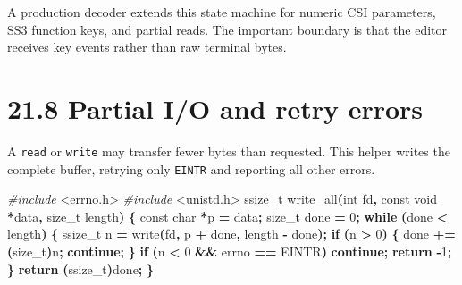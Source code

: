 \documentclass[
  oneside,
  openany]{book}
\newenvironment{Shaded}{\begin{snugshade}}{\end{snugshade}}
\newcommand{\ControlFlowTok}[1]{\textcolor[rgb]{0.13,0.29,0.53}{\textbf{#1}}}
\newcommand{\DataTypeTok}[1]{\textcolor[rgb]{0.13,0.29,0.53}{#1}}
\newcommand{\DecValTok}[1]{\textcolor[rgb]{0.00,0.00,0.81}{#1}}
\newcommand{\ImportTok}[1]{#1}
\newcommand{\NormalTok}[1]{#1}
\newcommand{\OperatorTok}[1]{\textcolor[rgb]{0.81,0.36,0.00}{\textbf{#1}}}
\newcommand{\PreprocessorTok}[1]{\textcolor[rgb]{0.56,0.35,0.01}{\textit{#1}}}
\begin{document}
A production decoder extends this state machine for numeric CSI
parameters, SS3 function keys, and partial reads. The important boundary
is that the editor receives key events rather than raw terminal bytes.

\hypertarget{partial-io-and-retry-errors}{%
\section{21.8 Partial I/O and retry
errors}\label{partial-io-and-retry-errors}}

A \texttt{read} or \texttt{write} may transfer fewer bytes than
requested. This helper writes the complete buffer, retrying only
\texttt{EINTR} and reporting all other errors.

\begin{Shaded}
\begin{Highlighting}[]
\PreprocessorTok{\#include }\ImportTok{\textless{}errno.h\textgreater{}}
\PreprocessorTok{\#include }\ImportTok{\textless{}unistd.h\textgreater{}}
\DataTypeTok{ssize\_t}\NormalTok{ write\_all}\OperatorTok{(}\DataTypeTok{int}\NormalTok{ fd}\OperatorTok{,} \DataTypeTok{const} \DataTypeTok{void} \OperatorTok{*}\NormalTok{data}\OperatorTok{,} \DataTypeTok{size\_t}\NormalTok{ length}\OperatorTok{)} \OperatorTok{\{}
    \DataTypeTok{const} \DataTypeTok{char} \OperatorTok{*}\NormalTok{p }\OperatorTok{=}\NormalTok{ data}\OperatorTok{;} \DataTypeTok{size\_t}\NormalTok{ done }\OperatorTok{=} \DecValTok{0}\OperatorTok{;}
    \ControlFlowTok{while} \OperatorTok{(}\NormalTok{done }\OperatorTok{\textless{}}\NormalTok{ length}\OperatorTok{)} \OperatorTok{\{}
        \DataTypeTok{ssize\_t}\NormalTok{ n }\OperatorTok{=}\NormalTok{ write}\OperatorTok{(}\NormalTok{fd}\OperatorTok{,}\NormalTok{ p }\OperatorTok{+}\NormalTok{ done}\OperatorTok{,}\NormalTok{ length }\OperatorTok{{-}}\NormalTok{ done}\OperatorTok{);}
        \ControlFlowTok{if} \OperatorTok{(}\NormalTok{n }\OperatorTok{\textgreater{}} \DecValTok{0}\OperatorTok{)} \OperatorTok{\{}\NormalTok{ done }\OperatorTok{+=} \OperatorTok{(}\DataTypeTok{size\_t}\OperatorTok{)}\NormalTok{n}\OperatorTok{;} \ControlFlowTok{continue}\OperatorTok{;} \OperatorTok{\}}
        \ControlFlowTok{if} \OperatorTok{(}\NormalTok{n }\OperatorTok{\textless{}} \DecValTok{0} \OperatorTok{\&\&}\NormalTok{ errno }\OperatorTok{==}\NormalTok{ EINTR}\OperatorTok{)} \ControlFlowTok{continue}\OperatorTok{;}
        \ControlFlowTok{return} \OperatorTok{{-}}\DecValTok{1}\OperatorTok{;}
    \OperatorTok{\}}
    \ControlFlowTok{return} \OperatorTok{(}\DataTypeTok{ssize\_t}\OperatorTok{)}\NormalTok{done}\OperatorTok{;}
\OperatorTok{\}}
\end{Highlighting}
\end{Shaded}
\end{document}
